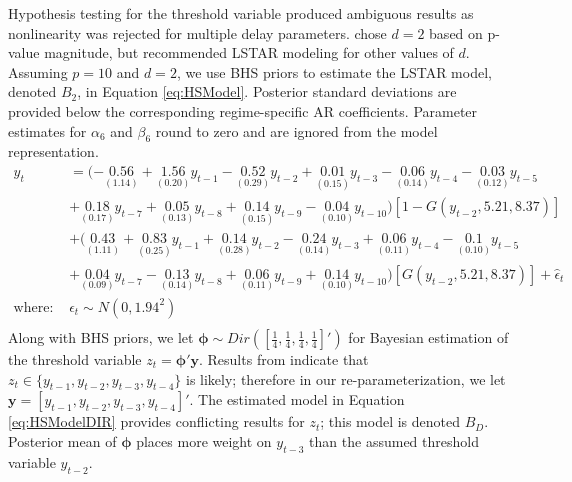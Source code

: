 Hypothesis testing for the threshold variable produced ambiguous results as nonlinearity was rejected for multiple delay parameters. \cite{Terasvirta2010} chose $d=2$ based on p-value magnitude, but recommended LSTAR modeling for other values of $d$. Assuming $p=10$ and $d=2$, we use BHS priors to estimate the LSTAR model, denoted $B_2$, in Equation \ref{eq:HSModel}. Posterior standard deviations are provided below the corresponding regime-specific AR coefficients. Parameter estimates for $\alpha_6$ and $\beta_6$ round to zero and are ignored from the model representation.
\begin{equation}
\begin{split}
 	y_t &=(-\underset{(1.14)}{0.56}+\underset{(0.20)}{1.56}y_{t-1}-\underset{(0.29)}{0.52}y_{t-2}+\underset{(0.15)}{0.01}y_{t-3}-\underset{(0.14)}{0.06}y_{t-4}-\underset{(0.12)}{0.03}y_{t-5}\\
 	&+\underset{(0.17)}{0.18}y_{t-7}+\underset{(0.13)}{0.05}y_{t-8}+\underset{(0.15)}{0.14}y_{t-9}-\underset{(0.10)}{0.04}y_{t-10})[1-G(y_{t-2},5.21,8.37)]\\
 	&+(\underset{(1.11)}{0.43}+\underset{(0.25)}{0.83}y_{t-1}+\underset{(0.28)}{0.14}y_{t-2}-\underset{(0.14)}{0.24}y_{t-3}+\underset{(0.11)}{0.06}y_{t-4}-\underset{(0.10)}{0.1}y_{t-5}\\
 	&+\underset{(0.09)}{0.04}y_{t-7}-\underset{(0.14)}{0.13}y_{t-8}+\underset{(0.11)}{0.06}y_{t-9}+\underset{(0.10)}{0.14}y_{t-10})[G(y_{t-2},5.21,8.37)]+\hat{\epsilon}_t\\
 	\textrm{where: } & \hat{\epsilon}_t \sim N(0, 1.94^2)\\
\end{split}
\label{eq:HSModel}
\end{equation}
Along with BHS priors, we let $\bm{\phi} \sim Dir ([\frac{1}{4},\frac{1}{4},\frac{1}{4},\frac{1}{4}]')$ for Bayesian estimation of the threshold variable $z_t=\bm{\phi}'\bm{y}$. Results from \cite{Terasvirta2010} indicate that $z_t \in \{y_{t-1},y_{t-2},y_{t-3},y_{t-4}\}$ is likely; therefore in our re-parameterization, we let $\bm{y}=[y_{t-1},y_{t-2},y_{t-3},y_{t-4}]'$. The estimated model in Equation \ref{eq:HSModelDIR} provides conflicting results for $z_t$; this model is denoted $B_D$. Posterior mean of $\bm{\phi}$ places more weight on $y_{t-3}$ than the assumed threshold variable $y_{t-2}$.
